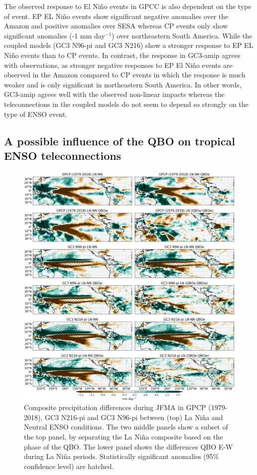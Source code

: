  The observed response to El Niño events in GPCC is also dependent on the type of event. EP EL Niño events show significant negative anomalies over the Amazon and positive anomalies over SESA whereas CP events only show significant anomalies (-1 mm day$^{-1}$) over northeastern South America. While the coupled models (GC3 N96-pi and GC3 N216) show a stronger response to EP  EL Niño events than to CP events.
  In contrast, the response in GC3-amip agrees with observations, as stronger negative responses to EP El Niño events are observed in the Amazon compared to CP events in which the response is much weaker and is only significant in northeastern South America. In other words, GC3-amip agrees well with the observed non-linear impacts whereas the teleconnections in the coupled models do not seem to depend so strongly on the type of ENSO event.    

\subsection{A possible influence of the QBO on tropical ENSO teleconnections}

\begin{figure}[b!]
\includegraphics[width=\linewidth]{figures/trops_qbolnprfma}
\caption[Precipitation anomalies as a function of QBO and ENSO phases]{Composite precipitation differences during JFMA in GPCP (1979-2018), GC3 N216-pi and GC3 N96-pi between (top) La Niña and Neutral ENSO conditions. The two middle panels show a subset of the top panel, by separating the La Niña composite based on the phase of the QBO. The lower panel shows the differences QBO E-W during La Niña periods. Statistically significant anomalies (95\% confidence level) are hatched.}
\label{fig:qbopr_pis}
\end{figure}  

